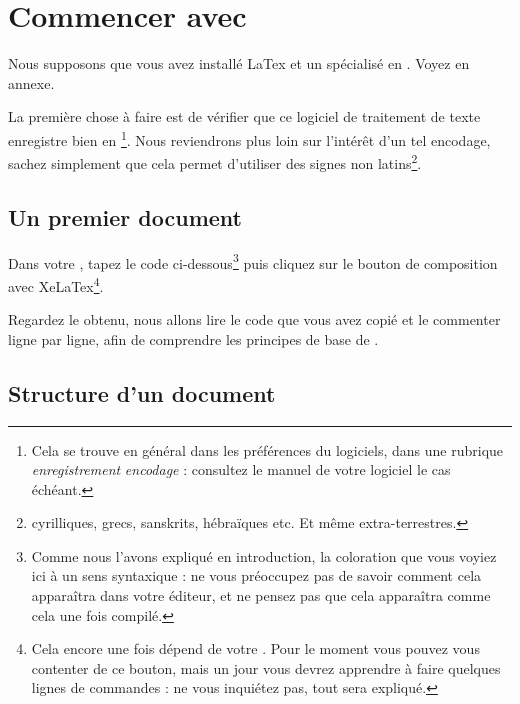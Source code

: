 \chapter{Commencer avec }

\begin{prealable}
Nous supposons que vous avez installé LaTex et un  spécialisé en . Voyez en annexe.

La première chose à faire est de vérifier que ce logiciel de traitement de texte enregistre bien en \footnote{Cela se trouve en général dans les préférences du logiciels, dans une rubrique \emph{enregistrement} \emph{encodage} : consultez le manuel de votre logiciel le cas échéant.}. Nous reviendrons plus loin sur l'intérêt d'un tel encodage, sachez simplement que cela permet d'utiliser des signes non latins\footnote{cyrilliques, grecs, sanskrits, hébraïques etc. Et même extra-terrestres.}.

\end{prealable}

\section{Un premier document}

Dans votre , tapez le code ci-dessous\footnote{Comme nous l'avons expliqué en introduction, la coloration que vous voyiez ici à un sens syntaxique : ne vous préoccupez pas de savoir comment cela apparaîtra dans votre éditeur, et ne pensez pas que cela apparaîtra comme cela une fois compilé.} puis cliquez sur le bouton de composition avec XeLaTex\footnote{Cela encore une fois dépend de votre . Pour le moment vous pouvez vous contenter de ce bouton, mais un jour vous devrez apprendre à faire quelques lignes de commandes : ne vous inquiétez pas, tout sera expliqué.}.


Regardez le  obtenu, nous allons lire le code que vous avez copié et le commenter ligne par ligne, afin de comprendre les principes de base de .
\FloatBarrier

\section{Structure d'un document }

